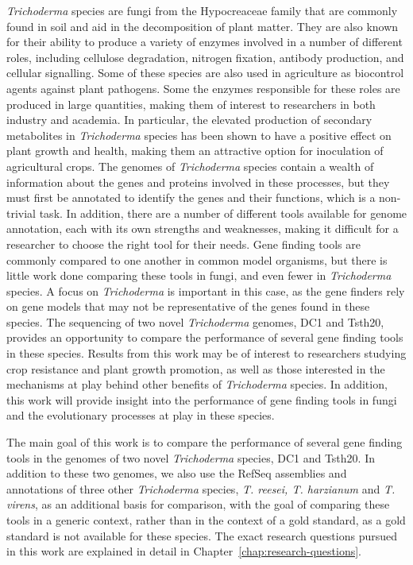 \textit{Trichoderma} species are fungi from the Hypocreaceae family
 that are commonly found in soil and aid in the decomposition of plant matter.
 They are also known for their ability to produce a variety of enzymes involved in a number of different roles, including cellulose degradation, nitrogen fixation, antibody production, and cellular signalling. Some of these species are also used in agriculture as biocontrol agents against plant pathogens. Some the enzymes responsible for these roles are produced in large quantities, making them of interest to researchers in both industry and academia. In particular, the elevated production of secondary metabolites in \textit{Trichoderma} species has been shown to have a positive effect on plant growth and health, making them an attractive option for inoculation of agricultural crops. The genomes of \textit{Trichoderma} species contain a wealth of information about the genes and proteins involved in these processes, but they must first be annotated to identify the genes and their functions, which is a non-trivial task. In addition, there are a number of different tools available for genome annotation, each with its own strengths and weaknesses, making it difficult for a researcher to choose the right tool for their needs. Gene finding tools are commonly compared to one another in common model organisms, but there is little work done comparing these tools in fungi, and even fewer in \textit{Trichoderma} species. A focus on \textit{Trichoderma} is important in this case, as the gene finders rely on gene models that may not be representative of the genes found in these species.
  The sequencing of two novel \textit{Trichoderma} genomes, DC1 and Tsth20, provides an opportunity to compare the performance of several gene finding tools in these species. Results from this work may be of interest to researchers studying crop resistance and plant growth promotion, as well as those interested in the mechanisms at play behind other benefits of \textit{Trichoderma} species. In addition, this work will provide insight into the performance of gene finding tools in fungi and the evolutionary processes at play in these species.

 The main goal of this work is to compare the performance of several gene finding tools in the genomes of two novel \textit{Trichoderma} species, DC1 and Tsth20. In addition to these two genomes, we also use the RefSeq assemblies and annotations of three other \textit{Trichoderma} species, \textit{T. reesei, T. harzianum} and \textit{T. virens}, as an additional basis for comparison, with the goal of comparing these tools in a generic context, rather than in the context of a gold standard, as a gold standard is not available for these species. The exact research questions pursued in this work are explained in detail in Chapter~\ref{chap:research-questions}. 


